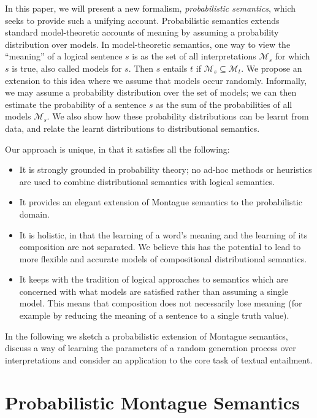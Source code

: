 \documentclass[letterpaper]{article}
\begin{document}
In this paper, we will present a new formalism, {\em probabilistic
  semantics\/}, which seeks to provide such a unifying
account. Probabilistic semantics extends standard model-theoretic
accounts of meaning by assuming a probability distribution over
models.  In model-theoretic semantics, one way to view the ``meaning''
of a logical sentence $s$ is as the set of all interpretations
$\mathcal{M}_s$ for which $s$ is true, also called models for
$s$. Then $s$ entails $t$ if $\mathcal{M}_s \subseteq
\mathcal{M}_t$. We propose an extension to this idea where we assume
that models occur randomly. Informally, we may assume a probability
distribution over the set of models; we can then estimate the
probability of a sentence $s$ as the sum of the probabilities of all
models $\mathcal{M}_s$. We also show how these probability
distributions can be learnt from data, and relate the learnt
distributions to distributional semantics.

Our approach is unique, in that it satisfies all the following:
\begin{itemize}
\item It is strongly grounded in probability theory; no ad-hoc methods
  or heuristics are used to combine distributional semantics with
  logical semantics.
\item It provides an elegant extension of Montague semantics to the
  probabilistic domain.
\item It is holistic, in that the learning of a word's meaning and the
  learning of its composition are not separated. We believe this has
  the potential to lead to more flexible and accurate models of
  compositional distributional semantics.
\item It keeps with the tradition of logical approaches to semantics
  which are concerned with what models are satisfied rather than
  assuming a single model. This means that composition does not
  necessarily lose meaning (for example by reducing the meaning of a
  sentence to a single truth value).
\end{itemize}

In the following we sketch a probabilistic extension of Montague semantics, discuss a way of learning the parameters of a random generation process over interpretations  and consider an application to the core task of textual entailment.

\section{Probabilistic Montague Semantics}
\end{document}
